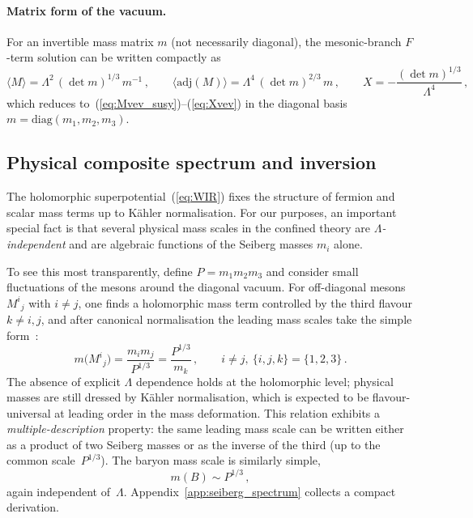 \documentclass[11pt,a4paper]{article}
\newcommand{\adj}{\mathrm{adj}}
\newcommand{\diag}{\mathrm{diag}}
\begin{document}
\paragraph{Matrix form of the vacuum.}
For an invertible mass matrix $m$ (not necessarily diagonal), the mesonic-branch
$F$-term solution can be written compactly as
\begin{equation}
  \langle M\rangle
  = \Lambda^2\,(\det m)^{1/3}\,m^{-1}\,,
  \qquad
  \langle \adj(M)\rangle
  = \Lambda^4\,(\det m)^{2/3}\,m\,,
  \qquad
  X=-\frac{(\det m)^{1/3}}{\Lambda^4}\,,
  \label{eq:matrix_vacuum}
\end{equation}
which reduces to~(\ref{eq:Mvev_susy})--(\ref{eq:Xvev}) in the diagonal basis
$m=\diag(m_1,m_2,m_3)$.

\subsection{Physical composite spectrum and inversion}
\label{sec:spectrum}

The holomorphic superpotential~(\ref{eq:WIR}) fixes the structure of
fermion and scalar mass terms up to K\"ahler normalisation.
For our purposes, an important special fact is that several physical
mass scales in the confined theory are \emph{$\Lambda$-independent} and
are algebraic functions of the Seiberg masses $m_i$ alone.

To see this most transparently, define $P=m_1m_2m_3$ and consider small
fluctuations of the mesons around the diagonal vacuum.
For off-diagonal mesons $M^i{}_j$ with $i\neq j$, one finds a holomorphic
mass term controlled by the third flavour $k\neq i,j$,
and after canonical normalisation the leading mass scales take the simple
form~\cite{Csaki:1996zb}:
\begin{equation}
  m\bigl(M^i{}_j\bigr)
  = \frac{m_i m_j}{P^{1/3}}
  = \frac{P^{1/3}}{m_k}\,,
  \qquad i\neq j,\ \{i,j,k\}=\{1,2,3\}\,.
  \label{eq:offdiag_mass}
\end{equation}
The absence of explicit $\Lambda$ dependence holds at the holomorphic level;
physical masses are still dressed by K\"ahler normalisation, which is expected
to be flavour-universal at leading order in the mass deformation.
This relation exhibits a \emph{multiple-description} property: the same
leading mass scale can be written either as a product of two Seiberg masses
or as the inverse of the third (up to the common scale~$P^{1/3}$).
The baryon mass scale is similarly simple,
\begin{equation}
  m(B)\sim P^{1/3}\,,
  \label{eq:baryon_mass}
\end{equation}
again independent of~$\Lambda$.
Appendix~\ref{app:seiberg_spectrum} collects a compact derivation.
\end{document}
